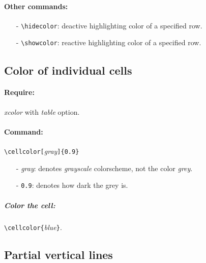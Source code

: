 \documentclass[11pt,a4paper]{article}
\begin{document}
\paragraph{Other commands:}
\begin{itemize}
	\item[-] \verb|\hidecolor|: deactive highlighting color of a specified row.
	\item[-] \verb|\showcolor|: reactive highlighting color of a specified row.
\end{itemize}

\subsection{Color of individual cells}
\paragraph{Require:} \emph{xcolor} with \emph{table} option.
\paragraph{Command:} \verb|\cellcolor[|\emph{gray}\verb|]{0.9}|
\begin{itemize}
	\item[-] \emph{gray}: denotes \emph{grayscale} colorscheme, not the color \emph{grey}.
	\item[-] \verb|0.9|: denotes how dark the grey is.
\end{itemize}
\subparagraph{Color the cell:} \verb|\cellcolor{|\emph{blue}\verb|}|.

\subsection{Partial vertical lines}
\end{document}
